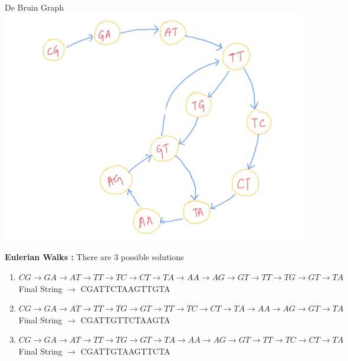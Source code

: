 \begin{enumerate}
\begin{enumerate}
De Bruin Graph \\
\includegraphics[scale=0.22]{1c2.jpeg}

\textbf{Eulerian Walks :} There are 3 possible solutions 
\begin{enumerate}
    \item $CG\rightarrow GA\rightarrow AT \rightarrow TT \rightarrow TC \rightarrow CT \rightarrow TA \rightarrow AA \rightarrow AG \rightarrow GT \rightarrow TT \rightarrow TG \rightarrow GT \rightarrow TA $ 
    \newline
     \newline
    Final String $\rightarrow$ CGATTCTAAGTTGTA \\

    \item  $CG\rightarrow GA\rightarrow AT \rightarrow TT \rightarrow TG \rightarrow GT \rightarrow TT \rightarrow TC \rightarrow  CT\rightarrow TA \rightarrow AA \rightarrow AG \rightarrow GT \rightarrow TA $ 
     \newline
      \newline
    Final String $\rightarrow$ CGATTGTTCTAAGTA \\

    \item  $CG\rightarrow GA\rightarrow AT \rightarrow TT \rightarrow TG \rightarrow GT \rightarrow TA \rightarrow AA \rightarrow  AG\rightarrow GT \rightarrow TT \rightarrow TC \rightarrow CT \rightarrow TA $ 
     \newline
     \newline
    Final String $\rightarrow$ CGATTGTAAGTTCTA
\end{enumerate}


\end{enumerate}
\end{enumerate}
